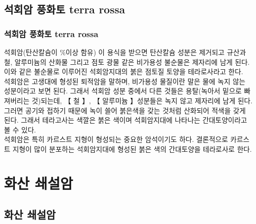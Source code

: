 \documentclass[12pt, a4paper, twoside]{book}
\begin{document}
	
	\clearpage
	\section{석회암 풍화토 terra rossa }



		\subsection{석회암 풍화토 terra rossa }


				석회암(탄산칼슘이 \%이상 함유) 이 용식을 받으면 탄산칼슘 성분은 제거되고 규산과 철, 알루미늄의 산화물 그리고 점토 광물 같은 비가용성 불순물은 제자리에 남게 된다. 
				이와 같은 불순물로 이루어진 석회암지대의 붉은 점토질 토양을 테라로사라고 한다. \\


				석회암은 고생대에 형성된 퇴적암을 말하며, 비가용성 물질이란 말은 물에 녹지 않는 성분이라고 보면 된다. 
				그래서 석회암 성분 중에서 다른 것들은 용탈(녹아서 밑으로 빠져버리는 것)되는데, 【 철 】, 【 알루미늄 】성분들은 녹지 않고 제자리에 남게 된다. 
				그러면 공기와 접하기 때문에 녹이 쓸어 붉은색을 갖는 것처럼 산화되어 적색을 갖게 된다. 
				그래서 테라고사는 색깔은 붉은 색이며 석회암지대에 나타나는 간대토양이라고 볼 수 있다. \\

				석회암은 특히 카르스트 지형이 형성되는 중요한 암석이기도 하다. 결론적으로 카르스트 지형이 많이 분포하는 석회암지대에 형성된 붉은 색의 간대토양을 테라로사로 한다.





	\clearpage
	\chapter{화산 쇄설암}
	\minitoc				%





	\clearpage
	\section{화산 쇄설암}
\end{document}
